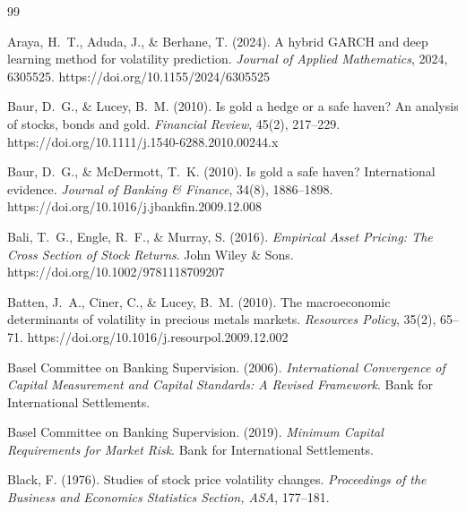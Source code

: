\documentclass[12pt,a4paper]{article}
\begin{document}
\newpage








\begin{thebibliography}{99}

Araya, H.~T., Aduda, J., \& Berhane, T. (2024). A hybrid GARCH and deep learning method for volatility prediction. \textit{Journal of Applied Mathematics}, 2024, 6305525. https://doi.org/10.1155/2024/6305525

Baur, D.~G., \& Lucey, B.~M. (2010). Is gold a hedge or a safe haven? An analysis of stocks, bonds and gold. \textit{Financial Review}, 45(2), 217--229. https://doi.org/10.1111/j.1540-6288.2010.00244.x

Baur, D.~G., \& McDermott, T.~K. (2010). Is gold a safe haven? International evidence. \textit{Journal of Banking \& Finance}, 34(8), 1886--1898. https://doi.org/10.1016/j.jbankfin.2009.12.008

Bali, T.~G., Engle, R.~F., \& Murray, S. (2016). \textit{Empirical Asset Pricing: The Cross Section of Stock Returns}. John Wiley \& Sons. https://doi.org/10.1002/9781118709207

Batten, J.~A., Ciner, C., \& Lucey, B.~M. (2010). The macroeconomic determinants of volatility in precious metals markets. \textit{Resources Policy}, 35(2), 65--71. https://doi.org/10.1016/j.resourpol.2009.12.002

Basel Committee on Banking Supervision. (2006). \textit{International Convergence of Capital Measurement and Capital Standards: A Revised Framework}. Bank for International Settlements.

Basel Committee on Banking Supervision. (2019). \textit{Minimum Capital Requirements for Market Risk}. Bank for International Settlements.

Black, F. (1976). Studies of stock price volatility changes. \textit{Proceedings of the Business and Economics Statistics Section, ASA}, 177--181.


\end{thebibliography}
\end{document}
